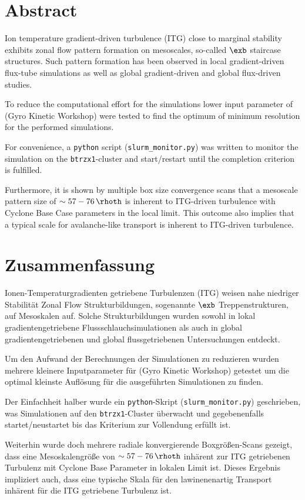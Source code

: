 \chapter*{Abstract}
\label{chap:abstractENG}

Ion temperature gradient-driven turbulence (ITG) close to marginal stability exhibits zonal flow pattern formation on mesoscales, so-called $\exb$ staircase structures. Such pattern formation has been observed in local gradient-driven flux-tube simulations as well as global gradient-driven and global flux-driven studies. \bigskip

To reduce the computational effort for the simulations lower input parameter of {\gkw} (Gyro Kinetic Workshop) were tested to find the optimum of minimum resolution for the performed simulations. \bigskip

For convenience, a \texttt{python} script (\texttt{slurm\_monitor.py}) was written to monitor the simulation on the \texttt{btrzx1}-cluster and start/restart until the completion criterion is fulfilled. \bigskip

Furthermore, it is shown by multiple box size convergence scans that a mesoscale pattern  size of $\sim 57-76\,\rhoth$ is inherent to ITG-driven turbulence with Cyclone Base Case parameters in the local limit. This outcome also implies that a typical scale for avalanche-like transport is inherent to ITG-driven turbulence.

\chapter*{Zusammenfassung}
\label{chap:abstractDE}

Ionen-Temperaturgradienten getriebene Turbulenzen (ITG) weisen nahe niedriger Stabilität Zonal Flow Strukturbildungen, sogenannte $\exb$ Treppenstrukturen, auf Mesoskalen auf. Solche Strukturbildungen wurden sowohl in lokal gradientengetriebene Flussschlauchsimulationen als auch in global gradientengetriebenen und global flussgetriebenen Untersuchungen entdeckt. \bigskip

Um den Aufwand der Berechnungen der Simulationen zu reduzieren wurden mehrere kleinere Inputparameter für {\gkw} (Gyro Kinetic Workshop) getestet um die optimal kleinste Auflösung für die ausgeführten Simulationen zu finden. \bigskip

Der Einfachheit halber wurde ein \texttt{python}-Skript (\texttt{slurm\_monitor.py}) geschrieben, was Simulationen auf den \texttt{btrzx1}-Cluster überwacht und gegebenenfalls startet/neustartet bis das Kriterium zur Vollendung erfüllt ist. \bigskip

Weiterhin wurde doch mehrere radiale konvergierende Boxgrößen-Scans gezeigt, dass eine Mesoskalengröße von $\sim 57-76\,\rhoth$ inhärent zur ITG getriebenen Turbulenz mit Cyclone Base Parameter in lokalen Limit ist. Dieses Ergebnis impliziert auch, dass eine typische Skala für den lawinenenartig Transport inhärent für die ITG getriebene Turbulenz ist.